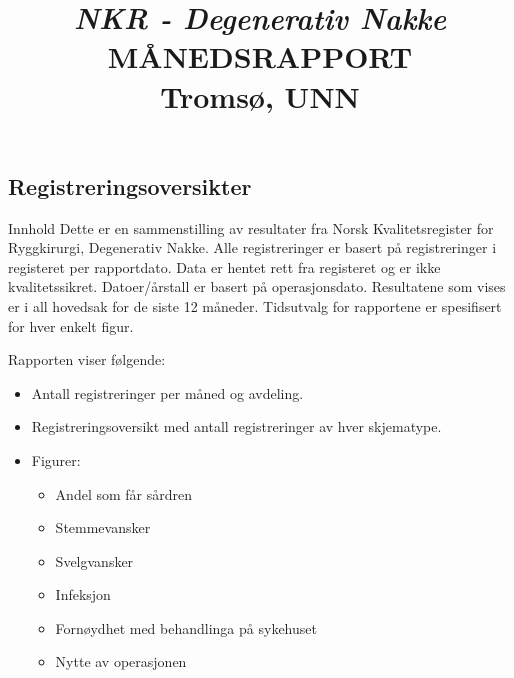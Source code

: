 \documentclass[presentation,xcolor=pdftex,dvipsnames,table]{beamer}\usepackage[]{graphicx}\usepackage[]{color}
\title[Degenerativ Nakke \\Tromsø, UNN]{\textit{NKR - Degenerativ Nakke} \\
MÅNEDSRAPPORT \\
Tromsø, UNN}
\date{}
\begin{document}
\begin{tiny}

\maketitle

\section{Registreringsoversikter}

\begin{frame}[fragile] {Innhold}
Dette er en sammenstilling av resultater  fra Norsk Kvalitetsregister for Ryggkirurgi, Degenerativ Nakke.
Alle registreringer er basert på registreringer i registeret per rapportdato. Data er hentet rett fra registeret og er ikke kvalitetssikret.
Datoer/årstall er basert på operasjonsdato. Resultatene som vises er i all hovedsak for de siste 12 måneder.
Tidsutvalg for rapportene er spesifisert for hver enkelt figur.

Rapporten viser følgende:
\begin{itemize}
\item Antall registreringer per måned og avdeling.
\item	Registreringsoversikt med antall registreringer av hver skjematype.
\item	Figurer:
  \begin{itemize}
  \item Andel som får sårdren
  \item	Stemmevansker
  \item	Svelgvansker
  \item	Infeksjon
  \item	Fornøydhet med behandlinga på sykehuset
  \item	Nytte av operasjonen
  \end{itemize}
\end{itemize}

\end{frame}


\begin{frame}[fragile]


\end{frame}
\end{tiny}
\end{document}
